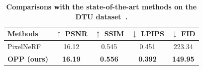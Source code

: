 
\begin{table}[t]
 \footnotesize
 \caption{
     \textbf{Comparisons with the state-of-the-art methods on the DTU dataset~\cite{DTU_jensen2014large}.}}
     \vspace{-3mm}
    \label{tab:DTU_SOTA}
    \setlength\tabcolsep{8pt}
        \begin{tabular}{l|cccc}
        \rowcolor[gray]{.9}
        \hline
        Methods           & $\uparrow$ PSNR                & $\uparrow$ SSIM               & $\downarrow$ LPIPS      & $\downarrow$ FID \\ \hline \hline                         
        PixelNeRF~\cite{PixelNeRF_yu2021pixelnerf}   & {16.12}                         & {0.545}                    & 0.451             &  223.34   \\
        \textbf{OPP (ours)} & \textbf{16.19}      & \textbf{0.556}     & \textbf{0.392} & \textbf{149.95} \\ 
        \hline
        \end{tabular}
\end{table}